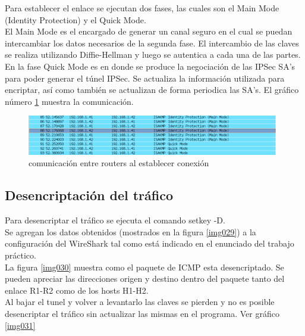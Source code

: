 \documentclass[a4paper,10pt]{article}
\begin{document}
	\indent Para establecer el enlace se ejecutan dos fases, las cuales son el Main Mode (Identity Protection) y el Quick Mode. \\
	\indent El Main Mode es el encargado de generar un canal seguro en el cual se puedan intercambiar los datos necesarios de la segunda fase. El intercambio de las claves se realiza utilizando Diffie-Hellman y luego se autentica a cada una de las partes. En la fase Quick Mode es en donde se produce la negociación de las IPSec SA’s para poder generar el túnel IPSec. Se actualiza la información utilizada para encriptar, así como también se actualizan de forma periodica las SA’s. El gráfico número \ref{img028} muestra la comunicación.
	
	\begin{figure}[!hfe]
		\centering
		\includegraphics[width=11cm]{Imagenes/establecimientoConexion.png}
		\caption{comunicación entre routers al establecer conexión}\label{img028}
	\end{figure}	

		\subsection{Desencriptación del tráfico}
	\indent Para desencriptar el tráfico se ejecuta el comando setkey -D. \\		\indent Se agregan los datos obtenidos (mostrados en la figura \ref{img029}) a la configuración del WireShark tal como está indicado en el enunciado del trabajo práctico. \\
	\indent	La figura \ref{img030} muestra como el paquete de ICMP esta desencriptado. Se pueden apreciar las direcciones origen y destino dentro del paquete tanto del enlace R1-R2 como de los hosts H1-H2.  \\
	\indent Al bajar el tunel y volver a levantarlo las claves se pierden y no es posible desencriptar el tráfico sin actualizar las mismas en el programa. Ver gráfico \ref{img031}
 
\end{document}
